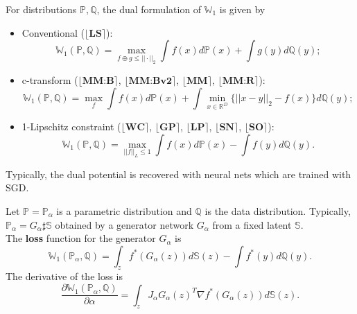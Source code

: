 \documentclass[final]{beamer}
\newlength{\colwidth}
\begin{document}
\begin{frame}[t]
\begin{columns}[t]
\begin{column}{\colwidth}
\begin{block}{ \noindent{} }
For distributions $\mathbb{P},\mathbb{Q}$, the dual formulation of $\mathbb{W}_{1}$ is given by
  \begin{itemize}
  \item{ Conventional ($\lfloor \textbf{LS}\rceil$):
  $$ \mathbb{W}_{1}(\mathbb{P},\mathbb{Q}) = \max_{f \oplus g  \leq ||\cdot||_{2}}\int f(x)d\mathbb{P}(x) + \int g(y)d\mathbb{Q}(y);$$}
  \item{c-transform ($\lfloor \textbf{MM:B}\rceil$, $\lfloor \textbf{MM:Bv2}\rceil$, $\lfloor \textbf{MM}\rceil$, $\lfloor \textbf{MM:R}\rceil$):
  $$ \mathbb{W}_{1}(\mathbb{P},\mathbb{Q}) = \max_{f}\int f(x)d\mathbb{P}(x) + \int \min_{x \in \mathbb{R}^{D}} \{||x - y||_{2} - f(x)\} d\mathbb{Q}(y);$$}
  \item{ 1-Lipschitz constraint ($\lfloor \textbf{WC}\rceil$, $\lfloor \textbf{GP}\rceil$, $\lfloor \textbf{LP}\rceil$, $\lfloor \textbf{SN}\rceil$, $\lfloor \textbf{SO}\rceil$):
  $$ \mathbb{W}_{1}(\mathbb{P},\mathbb{Q}) = \max_{||f||_{L} \leq 1}\int f(x)d\mathbb{P}(x) - \int f(y)d\mathbb{Q}(y).$$}
  \end{itemize}
  Typically, the dual potential is recovered with neural nets which are trained with SGD.
  \end{block}

 \begin{block}{ \noindent{}}
 
Let $\mathbb{P} = \mathbb{P}_{\alpha}$ is a parametric distribution and $\mathbb{Q}$ is the data distribution. Typically, $ \mathbb{P}_{\alpha} = G_{\alpha}\sharp \mathbb{S}$ obtained by a generator network $G_{\alpha}$ from a fixed latent $\mathbb{S}$.\\[0.8 cm]
The \textbf{loss} function for the generator $G_{\alpha}$ is
\vspace{2 mm}
$$ \mathbb{W}_{1}(\mathbb{P}_{\alpha},\mathbb{Q}) = \int_{z} f^{*}(G_{\alpha}(z))d\mathbb{S}(z) - \int f^{*}(y)d\mathbb{Q}(y).$$
The derivative of the loss is
\vspace{4 mm} 
$$  \frac{\partial \mathbb{W}_{1}(\mathbb{P}_{\alpha},\mathbb{Q})}{\partial \alpha } = \int_{z} J_{\alpha}G_{\alpha}(z)^{T}\nabla f^{*}(G_{\alpha}(z))d\mathbb{S}(z).$$


\end{block}
\end{column}
\end{columns}
\end{frame}
\end{document}

